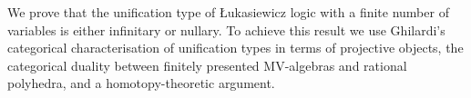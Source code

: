 
We prove that the unification type of {\L}ukasiewicz logic with a finite number of variables is either infinitary or nullary.  To achieve this result we use Ghilardi's categorical characterisation of unification types in terms of projective objects,  the categorical duality between finitely presented MV-algebras and rational polyhedra, and a homotopy-theoretic argument.

